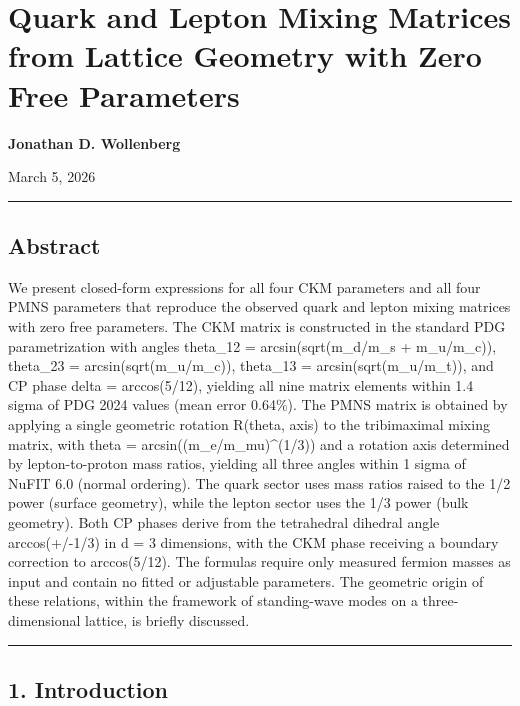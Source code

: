 \documentclass[
]{article}
\author{}
\date{}
\begin{document}
\section{Quark and Lepton Mixing Matrices from Lattice Geometry with
Zero Free
Parameters}\label{quark-and-lepton-mixing-matrices-from-lattice-geometry-with-zero-free-parameters}

\textbf{Jonathan D. Wollenberg}

March 5, 2026

\begin{center}\rule{0.5\linewidth}{0.5pt}\end{center}

\subsection{Abstract}\label{abstract}

We present closed-form expressions for all four CKM parameters and all
four PMNS parameters that reproduce the observed quark and lepton mixing
matrices with zero free parameters. The CKM matrix is constructed in the
standard PDG parametrization with angles theta\_12 =
arcsin(sqrt(m\_d/m\_s + m\_u/m\_c)), theta\_23 =
arcsin(sqrt(m\_u/m\_c)), theta\_13 = arcsin(sqrt(m\_u/m\_t)), and CP
phase delta = arccos(5/12), yielding all nine matrix elements within 1.4
sigma of PDG 2024 values (mean error 0.64\%). The PMNS matrix is
obtained by applying a single geometric rotation R(theta, axis) to the
tribimaximal mixing matrix, with theta = arcsin((m\_e/m\_mu)\^{}(1/3))
and a rotation axis determined by lepton-to-proton mass ratios, yielding
all three angles within 1 sigma of NuFIT 6.0 (normal ordering). The
quark sector uses mass ratios raised to the 1/2 power (surface
geometry), while the lepton sector uses the 1/3 power (bulk geometry).
Both CP phases derive from the tetrahedral dihedral angle arccos(+/-1/3)
in d = 3 dimensions, with the CKM phase receiving a boundary correction
to arccos(5/12). The formulas require only measured fermion masses as
input and contain no fitted or adjustable parameters. The geometric
origin of these relations, within the framework of standing-wave modes
on a three-dimensional lattice, is briefly discussed.

\begin{center}\rule{0.5\linewidth}{0.5pt}\end{center}

\subsection{1. Introduction}\label{introduction}
\end{document}
